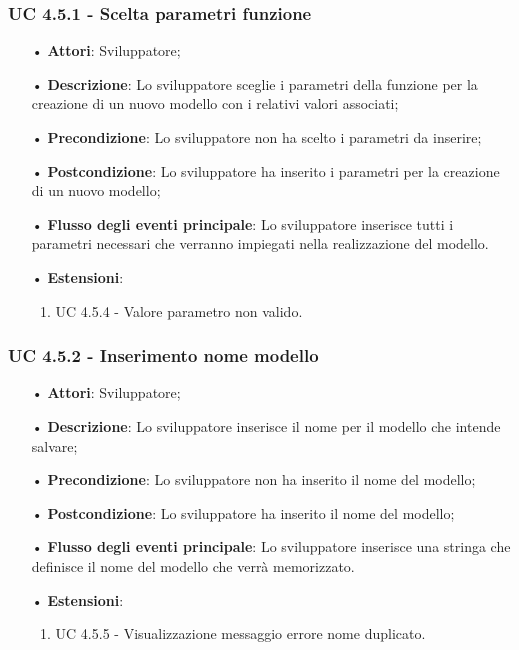 \subsubsection{UC 4.5.1 - Scelta parametri funzione}
\begin{itemize}
\item[•]\textbf{Attori}: Sviluppatore;
\item[•]\textbf{Descrizione}: Lo sviluppatore sceglie i parametri della funzione per la creazione di un nuovo modello con i relativi valori associati;
\item[•]\textbf{Precondizione}: Lo sviluppatore non ha scelto i parametri da inserire;
\item[•]\textbf{Postcondizione}: Lo sviluppatore ha inserito i parametri per la creazione di un nuovo modello;
\item[•]\textbf{Flusso degli eventi principale}:  Lo sviluppatore inserisce tutti i parametri necessari che verranno impiegati nella realizzazione del modello.
\item[•] \textbf{Estensioni}: 
\begin{enumerate}
	\item UC 4.5.4 - Valore parametro non valido.
\end{enumerate}
\end{itemize}

\subsubsection{UC 4.5.2 - Inserimento nome modello}
\begin{itemize}
\item[•]\textbf{Attori}: Sviluppatore;
\item[•]\textbf{Descrizione}: Lo sviluppatore inserisce il nome per il modello che intende salvare;
\item[•]\textbf{Precondizione}: Lo sviluppatore non ha inserito il nome del modello;
\item[•]\textbf{Postcondizione}: Lo sviluppatore ha inserito il nome del modello;
\item[•]\textbf{Flusso degli eventi principale}:  Lo sviluppatore inserisce una stringa che definisce il nome del modello che verrà memorizzato.
\item[•] \textbf{Estensioni}: 
\begin{enumerate}
	\item UC 4.5.5 - Visualizzazione messaggio errore nome duplicato.
\end{enumerate}
\end{itemize}

